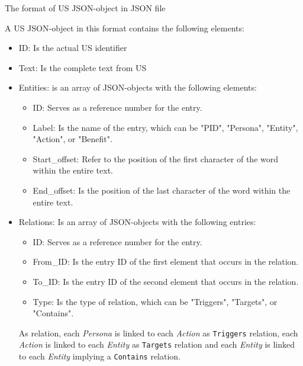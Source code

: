 \begin{MyListing}
	\centering
	
	\caption{The format of US JSON-object in JSON file}\label{list:conflict_desing_json_format}
\end{MyListing}
A US JSON-object in this format contains the following elements:
\begin{itemize}
	\item ID: Is the actual US identifier
	
	\item Text: Is the complete text from US
	
	\item Entities: is an array of JSON-objects with the following elements:
	\begin{itemize}
		\item ID: Serves as a reference number for the entry.
		
		\item Label: Is the name of the entry, which can be "PID", "Persona", "Entity", "Action", or "Benefit".
		
		\item Start\_offset: Refer to the position of the first character of the word within the entire text.
		
		\item End\_offset: Is the position of the last character of the word within the entire text.
	\end{itemize}
	\item Relations: Is an array of JSON-objects with the following entries:
	\begin{itemize}
		\item ID: Serves as a reference number for the entry.
		
		\item From\_ID: Is the entry ID of the first element that occurs in the relation.
		
		\item To\_ID: Is the entry ID of the second element that occurs in the relation.
		
		\item Type: Is the type of relation, which can be "Triggers", "Targets", or "Contains".
	\end{itemize}
	As relation, each \emph{Persona} is linked to each \emph{Action} as \texttt{Triggers} relation, each \emph{Action} is linked to each \emph{Entity} as \texttt{Targets} relation and each \emph{Entity} is linked to each \emph{Entity} implying a \texttt{Contains} relation.
\end{itemize}

